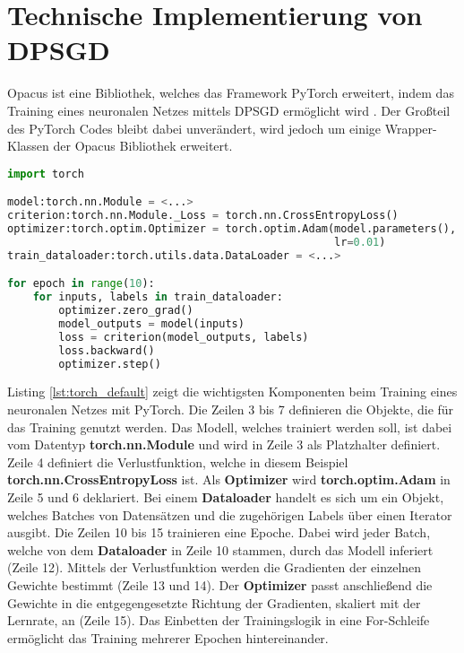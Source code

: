 \section{Technische Implementierung von DPSGD}\label{sec:opacu_implementierung}
Opacus ist eine Bibliothek, welches das Framework PyTorch erweitert, indem das Training eines neuronalen Netzes mittels DPSGD ermöglicht wird \cite{opacus}.
Der Großteil des PyTorch Codes bleibt dabei unverändert, wird jedoch um einige Wrapper-Klassen der Opacus Bibliothek erweitert.

\begin{lstlisting}[language=Python,caption={Training einer Epoche in PyTorch},captionpos=b,showstringspaces=false,label={lst:torch_default}]
import torch

model:torch.nn.Module = <...> 
criterion:torch.nn.Module._Loss = torch.nn.CrossEntropyLoss()
optimizer:torch.optim.Optimizer = torch.optim.Adam(model.parameters(), 
                                                   lr=0.01)
train_dataloader:torch.utils.data.DataLoader = <...> 

for epoch in range(10):
    for inputs, labels in train_dataloader:
        optimizer.zero_grad()
        model_outputs = model(inputs)
        loss = criterion(model_outputs, labels)
        loss.backward()
        optimizer.step()
\end{lstlisting}

Listing \ref{lst:torch_default} zeigt die wichtigsten Komponenten beim Training eines neuronalen Netzes mit PyTorch.
Die Zeilen 3 bis 7 definieren die Objekte, die für das Training genutzt werden. 
Das Modell, welches trainiert werden soll, ist dabei vom Datentyp \textbf{torch.nn.Module} und wird in Zeile 3 als Platzhalter definiert.
Zeile 4 definiert die Verlustfunktion, welche in diesem Beispiel \textbf{torch.nn.CrossEntropyLoss} ist.
Als \textbf{Optimizer} wird \textbf{torch.optim.Adam} in Zeile 5 und 6 deklariert.
Bei einem \textbf{Dataloader} handelt es sich um ein Objekt, welches Batches von Datensätzen und die zugehörigen Labels über einen Iterator ausgibt.
Die Zeilen 10 bis 15 trainieren eine Epoche. 
Dabei wird jeder Batch, welche von dem \textbf{Dataloader} in Zeile 10 stammen, durch das Modell inferiert (Zeile 12). 
Mittels der Verlustfunktion werden die Gradienten der einzelnen Gewichte bestimmt (Zeile 13 und 14).
Der \textbf{Optimizer} passt anschließend die Gewichte in die entgegengesetzte Richtung der Gradienten, skaliert mit der Lernrate, an (Zeile 15).
Das Einbetten der Trainingslogik in eine For-Schleife ermöglicht das Training mehrerer Epochen hintereinander.

